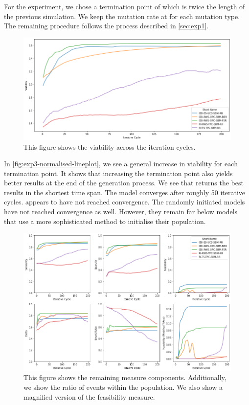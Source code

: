 \documentclass[./../../paper.tex]{subfiles}
\begin{document}
For the experiment, we chose a termination point of  which is twice the length of the previous simulation. We keep the mutation rate at  for each mutation type. The remaining procedure follows the process described in \autoref{sec:exp1}.

\begin{figure}[htbp]
    \centering
    \includegraphics[width=\textwidth]{figures/generated/exp3_relative_cycles.png}
    \caption{This figure shows the viability across the iteration cycles.}
    \label{fig:exp3-normalised-lineplot}
\end{figure}

In \autoref{fig:exp3-normalised-lineplot}, we see a general increase in viability for each termination point. It shows that increasing the termination point also yields better results at the end of the generation process. 
We see that  returns the best results in the shortest time span. The model converges after roughly 50 iterative cycles.  appears to have not reached convergence. 
The randomly initiated models have not reached convergence as well. However, they remain far below models that use a more sophisticated method to initialise their population. 

\begin{figure}[htbp]
    \centering
    \includegraphics[width=\textwidth]{figures/generated/exp3_cycles_components.png}
    \caption{This figure shows the remaining measure components. Additionally, we show the ratio of events within the population. We also show a magnified version of the feasibility measure.}
    \label{fig:exp3-components}
\end{figure}
\end{document}
